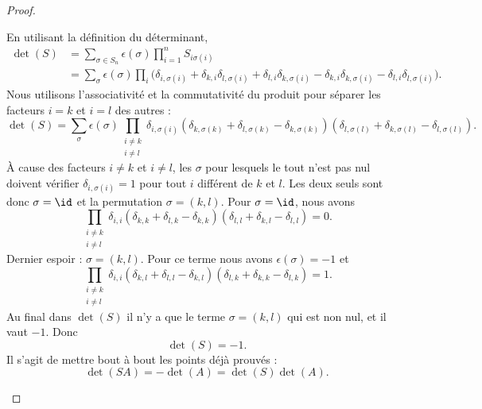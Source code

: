 \begin{proof}
\begin{subproof}
		\spitem[\ref{ITEMooSHRQooQrqVdO}]
		En utilisant la définition du déterminant,
		\begin{subequations}
			\begin{align}
				\det(S) & =\sum_{\sigma\in S_n}\epsilon(\sigma)\prod_{i=1}^nS_{i\sigma(i)}                                                                                                                                           \\
				        & =\sum_{\sigma}\epsilon(\sigma)\prod_i\big( \delta_{i,\sigma(i)}+\delta_{k,i}\delta_{l,\sigma(i)}+\delta_{l,i}\delta_{k,\sigma(i)}-\delta_{k,i}\delta_{k,\sigma(i)}-\delta_{l,i}\delta_{l,\sigma(i)} \big).
			\end{align}
		\end{subequations}
		Nous utilisons l'associativité et la commutativité du produit pour séparer les facteurs \( i=k\) et \( i=l\) des autres :
		\begin{equation}
			\det(S)=\sum_{\sigma}\epsilon(\sigma)\prod_{\substack{i\neq k \\i\neq l}}\delta_{i,\sigma(i)}(\delta_{k,\sigma(k)}+\delta_{l,\sigma(k)}-\delta_{k,\sigma(k)})(\delta_{l,\sigma(l)}+\delta_{k,\sigma(l)}-\delta_{l,\sigma(l)}).
		\end{equation}
		À cause des facteurs \( i\neq k\) et \( i\neq l\), les \( \sigma\) pour lesquels le tout n'est pas nul doivent vérifier \( \delta_{i,\sigma(i)}=1\) pour tout \( i\) différent de \( k\) et \( l\). Les deux seuls sont donc \( \sigma=\id\) et la permutation \( \sigma=(k,l)\). Pour \( \sigma=\id\), nous avons
		\begin{equation}
			\prod_{\substack{i\neq k \\i\neq l}}\delta_{i,i}(\delta_{k,k}+\delta_{l,k}-\delta_{k,k})(\delta_{l,l}+\delta_{k,l}-\delta_{l,l})=0.
		\end{equation}
		Dernier espoir : \( \sigma=(k,l)\). Pour ce terme nous avons \( \epsilon(\sigma)=-1\) et
		\begin{equation}
			\prod_{\substack{i\neq k \\i\neq l}}\delta_{i,i}(\delta_{k,l}+\delta_{l,l}-\delta_{k,l})(\delta_{l,k}+\delta_{k,k}-\delta_{l,k})=1.
		\end{equation}
		Au final dans \( \det(S)\) il n'y a que le terme \( \sigma=(k,l)\) qui est non nul, et il vaut \( -1\). Donc
		\begin{equation}
			\det(S)=-1.
		\end{equation}
		\spitem[\ref{ITEMooQXSEooMWiKbL}]
		Il s'agit de mettre bout à bout les points déjà prouvés :
		\begin{equation}
			\det(SA)=-\det(A)=\det(S)\det(A).
		\end{equation}
	\end{subproof}
\end{proof}

